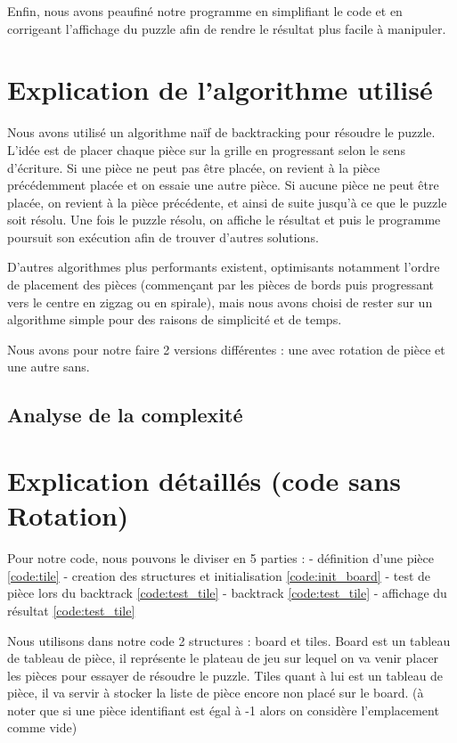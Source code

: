 \documentclass[french]{rapportAlgoM1}
\begin{document}
Enfin, nous avons peaufiné notre programme en simplifiant le code
et en corrigeant l'affichage du puzzle afin de rendre le résultat
plus facile à manipuler.

\section*{Explication de l'algorithme utilisé}

Nous avons utilisé un algorithme naïf de backtracking pour résoudre
le puzzle. L’idée est de placer chaque pièce sur la grille en
progressant selon le sens d’écriture. Si une pièce ne peut pas être
placée, on revient à la pièce précédemment placée et on essaie une
autre pièce. Si aucune pièce ne peut être placée, on revient à la
pièce précédente, et ainsi de suite jusqu’à ce que le puzzle soit
résolu. Une fois le puzzle résolu, on affiche le résultat et puis
le programme poursuit son exécution afin de trouver d'autres
solutions. 

D'autres algorithmes plus performants existent, optimisants notamment
l'ordre de placement des pièces (commençant par les pièces de bords
puis progressant vers le centre en zigzag ou en spirale), mais nous
avons choisi de rester sur un algorithme simple pour des raisons de
simplicité et de temps.

Nous avons pour notre faire 2 versions différentes : une avec rotation de pièce et une autre sans.

\subsection*{Analyse de la complexité}


\section*{Explication détaillés (code sans Rotation)}

Pour notre code, nous pouvons le diviser en 5 parties : 
- définition d'une pièce \ref{code:tile}
- creation des structures et initialisation \ref{code:init_board} 
- test de pièce lors du backtrack \ref{code:test_tile} 
- backtrack \ref{code:test_tile} 
- affichage du résultat \ref{code:test_tile} 

 

Nous utilisons dans notre code 2 structures : board et tiles.
Board est un tableau de tableau de pièce, il représente le plateau de jeu sur lequel on va venir placer les pièces pour essayer de résoudre le puzzle. 
Tiles quant à lui est un tableau de pièce, il va servir à stocker la liste de pièce encore non placé sur le board.
(à noter que si une pièce identifiant est égal à -1 alors on considère l'emplacement comme vide)
\end{document}
